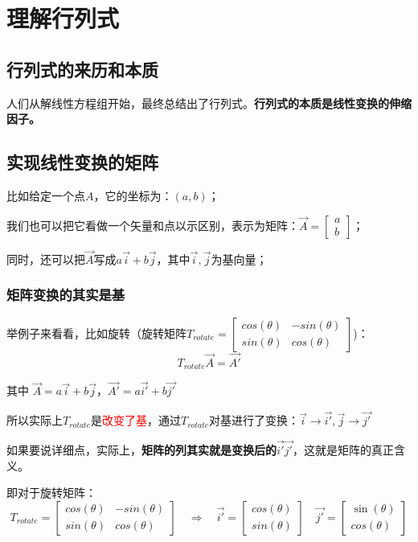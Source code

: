 \documentclass[12pt]{article}
\begin{document}
\section{理解行列式\cite{How_To_Understand_Determinant}}
\subsection{行列式的来历和本质}
人们从解线性方程组开始，最终总结出了行列式。\textbf{行列式的本质是线性变换的伸缩因子。}

\subsection{实现线性变换的矩阵}
比如给定一个点$A$，它的坐标为：$(a,b)$；

我们也可以把它看做一个矢量和点以示区别，表示为矩阵：$\vec{A} = \begin{bmatrix}a \\ b\end{bmatrix}$；

同时，还可以把$\vec{A}$写成$a\vec{i} + b\vec{j}$，其中$\vec{i},\vec{j}$为基向量；

\subsubsection{矩阵变换的其实是基}
举例子来看看，比如旋转（旋转矩阵$T_{rotate}=\begin{bmatrix}cos(\theta)&-sin(\theta)\\sin(\theta)&cos(\theta)\end{bmatrix}$)：
$$
T_{rotate}\vec{A} = \vec{A'}
$$

其中 $\vec{A} = a\vec{i} + b\vec{j}$，$\vec{A'} = a\vec{i'} + b\vec{j'}$

所以实际上$T_{rotate}$是\textcolor{red}{改变了基}，通过$T_{rotate}$对基进行了变换：$\vec{i} \rightarrow \vec{i'}, \vec{j} \rightarrow \vec{j'}$

如果要说详细点，实际上，\textbf{矩阵的列其实就是变换后的$\vec{i'} \vec{j'}$}，这就是矩阵的真正含义。

即对于旋转矩阵：
$$
T_{rotate}=\begin{bmatrix}cos(\theta)&-sin(\theta)\\sin(\theta)&cos(\theta)\end{bmatrix} \quad \Rightarrow \quad 
\vec{i'} = \begin{bmatrix}
cos(\theta) \\ sin(\theta)\end{bmatrix} \quad \vec{j'} = \begin{bmatrix}
\sin(\theta) \\cos(\theta)\end{bmatrix}
$$
\end{document}
